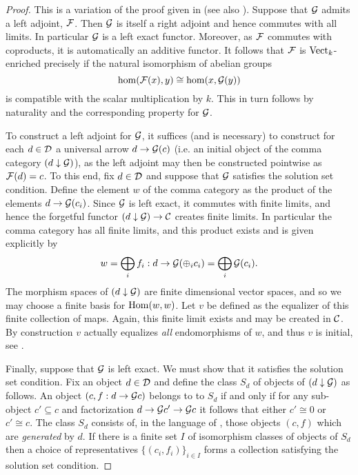 \documentclass[a4paper]{amsart}
\begin{document}
\begin{proof} This is a variation of the proof given in \cite[V.6.Thm 2]{MR0354798} (see also \cite[Ex. 3-M]{MR0166240}).
Suppose that $\mathcal G$ admits a left adjoint, $\mathcal F$. Then $\mathcal G$ is itself a right adjoint and hence commutes with all limits. In particular $\mathcal G$ is a left exact functor. Moreover, as $\mathcal F$ commutes with coproducts, it is automatically an additive functor. It follows that $\mathcal F$ is ${\mathrm{Vect}_k}$-enriched precisely if the natural isomorphism of abelian groups 
\begin{equation*}
	\hom( \mathcal F(x), y) \cong \hom(x, \mathcal G(y))
\end{equation*}
is compatible with the scalar multiplication by $k$. This in turn follows by naturality and the corresponding property for $\mathcal G$. 


To construct a left adjoint for $\mathcal G$, it suffices (and is necessary) to construct for each $d \in \mathcal D$ a universal arrow $d \to \mathcal G(c)$ (i.e. an initial object of the comma category $(d \downarrow \mathcal G)$),
as the left adjoint may then be constructed pointwise as $\mathcal F(d) = c$. To this end, fix $d \in \mathcal D$ and suppose that $\mathcal G$ satisfies the solution set condition. Define the element $w$ of the comma category as the product of the elements $d \to \mathcal G(c_i)$. Since $\mathcal G$ is left exact, it commutes with finite limits, and hence the forgetful functor $(d \downarrow \mathcal G) \to \mathcal C$ creates finite limits. In particular the comma category has all finite limits, and this  product exists and is given explicitly by 
\begin{equation*}
	w = \bigoplus_i f_i :  d \to \mathcal G( \oplus_i c_i) = \bigoplus_i \mathcal G(c_i).
\end{equation*}
The morphism spaces of $(d \downarrow \mathcal G)$ are finite dimensional vector spaces, and so we may choose a finite basis for $\operatorname{Hom}(w,w)$. Let $v$ be defined as the equalizer of this finite collection of maps. Again, this finite limit exists and may be created in $\mathcal C$. By construction $v$ actually equalizes {\em all} endomorphisms of $w$, and thus $v$ is initial, see  \cite[V.6.Thm 1]{MR0354798}.

Finally, suppose that $\mathcal G$ is left exact. We must show that it satisfies the solution set condition. Fix an object $d \in \mathcal D$ and define the class $S_d$ of objects of $(d \downarrow \mathcal G)$ as follows. An object $(c, f:d \to \mathcal G c)$ belongs to to $S_d$ if and only if for any sub-object $c' \subseteq c$ and factorization $d \to \mathcal G c' \to \mathcal G c$ it follows that either $c' \cong 0$ or $c' \cong c$. The class $S_d$ consists of, in the language of \cite[Ex. 3-J]{MR0166240}, those objects $(c,f)$ which are {\em generated} by $d$. If there is a finite set $I$ of isomorphism classes of objects of $S_d$ then a choice of representatives $\{(c_i, f_i)\}_{i \in I}$ forms a collection satisfying the solution set condition. 


\end{proof}
\end{document}
